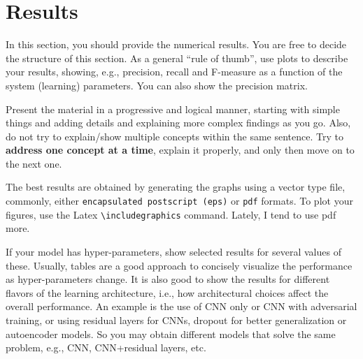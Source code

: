 
\section{Results}
\label{sec:results}

In this section, you should provide the numerical results. You are free to decide the structure of this section. As a general ``rule of thumb'', use plots to describe your results, showing, e.g., precision, recall and \mbox{F-measure} as a function of the system (learning) parameters. You can also show the precision matrix. 

\begin{remark}
Present the material in a progressive and logical manner, starting with simple things and adding details and explaining more complex findings as you go. Also, do not try to explain/show multiple concepts within the same sentence. Try to \textbf{address one concept at a time}, explain it properly, and only then move on to the next one.
\end{remark}

\begin{remark}
The best results are obtained by generating the graphs using a vector type file, commonly, either \texttt{encapsulated postscript (eps)} or \texttt{pdf} formats. To plot your figures, use the Latex \texttt{\textbackslash includegraphics} command. Lately, I tend to use pdf more.
\end{remark}

\begin{remark}
If your model has hyper-parameters, show selected results for several values of these. Usually, tables are a good approach to concisely visualize the performance as hyper-parameters change. It is also good to show the results for different flavors of the learning architecture, i.e., how architectural choices affect the overall performance. An example is the use of CNN only or CNN with adversarial training, or using residual layers for CNNs, dropout for better generalization or autoencoder models. So you may obtain different models that solve the same problem, e.g., CNN, CNN+residual layers, etc.
\end{remark}
